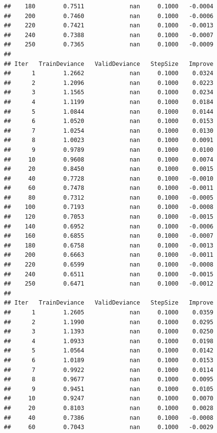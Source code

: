\documentclass[]{book}
\begin{document}
\begin{verbatim}
##    180        0.7511             nan     0.1000   -0.0004
##    200        0.7460             nan     0.1000   -0.0006
##    220        0.7421             nan     0.1000   -0.0013
##    240        0.7388             nan     0.1000   -0.0007
##    250        0.7365             nan     0.1000   -0.0009
## 
## Iter   TrainDeviance   ValidDeviance   StepSize   Improve
##      1        1.2662             nan     0.1000    0.0324
##      2        1.2096             nan     0.1000    0.0223
##      3        1.1565             nan     0.1000    0.0234
##      4        1.1199             nan     0.1000    0.0184
##      5        1.0844             nan     0.1000    0.0144
##      6        1.0520             nan     0.1000    0.0153
##      7        1.0254             nan     0.1000    0.0130
##      8        1.0023             nan     0.1000    0.0091
##      9        0.9789             nan     0.1000    0.0100
##     10        0.9608             nan     0.1000    0.0074
##     20        0.8450             nan     0.1000    0.0015
##     40        0.7728             nan     0.1000   -0.0010
##     60        0.7478             nan     0.1000   -0.0011
##     80        0.7312             nan     0.1000   -0.0005
##    100        0.7193             nan     0.1000   -0.0008
##    120        0.7053             nan     0.1000   -0.0015
##    140        0.6952             nan     0.1000   -0.0006
##    160        0.6855             nan     0.1000   -0.0007
##    180        0.6758             nan     0.1000   -0.0013
##    200        0.6663             nan     0.1000   -0.0011
##    220        0.6599             nan     0.1000   -0.0008
##    240        0.6511             nan     0.1000   -0.0015
##    250        0.6471             nan     0.1000   -0.0012
## 
## Iter   TrainDeviance   ValidDeviance   StepSize   Improve
##      1        1.2605             nan     0.1000    0.0359
##      2        1.1990             nan     0.1000    0.0295
##      3        1.1393             nan     0.1000    0.0250
##      4        1.0933             nan     0.1000    0.0198
##      5        1.0564             nan     0.1000    0.0142
##      6        1.0189             nan     0.1000    0.0153
##      7        0.9922             nan     0.1000    0.0114
##      8        0.9677             nan     0.1000    0.0095
##      9        0.9451             nan     0.1000    0.0105
##     10        0.9247             nan     0.1000    0.0070
##     20        0.8103             nan     0.1000    0.0028
##     40        0.7386             nan     0.1000   -0.0008
##     60        0.7043             nan     0.1000   -0.0029

\end{verbatim}
\end{document}
